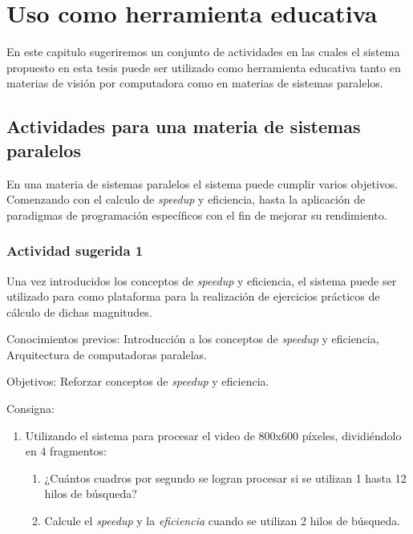 
\section{Uso como herramienta educativa}

\label{usoEducativo}

En este capitulo sugeriremos un conjunto de actividades en las cuales el sistema
propuesto en esta tesis puede ser utilizado como herramienta educativa tanto en
materias de visión por computadora como en materias de sistemas paralelos.

\subsection{Actividades para una materia de sistemas paralelos}

En una materia de sistemas paralelos el sistema puede cumplir varios objetivos.
Comenzando con el calculo de \emph{speedup} y eficiencia, hasta la aplicación de
paradigmas de programación específicos con el fin de mejorar su rendimiento.

\subsubsection{Actividad sugerida 1}

Una vez introducidos los conceptos de \emph{speedup} y eficiencia, el sistema
puede ser utilizado para como plataforma para la realización de ejercicios
prácticos de cálculo de dichas magnitudes.

\begin{description}

	\item{Conocimientos previos}: Introducción a los conceptos de
		\emph{speedup} y eficiencia, Arquitectura de computadoras
		paralelas.

	\item{Objetivos}: Reforzar conceptos de \emph{speedup} y eficiencia.

	\item{Consigna}: \begin{enumerate}

	\item{Utilizando el sistema para procesar el video de 800x600 píxeles,
		dividiéndolo en 4 fragmentos:

\begin{enumerate}

	\item{¿Cuántos cuadros por segundo se logran procesar si se utilizan 1
		hasta 12 hilos de búsqueda?}

	\item{Calcule el \emph{speedup} y la \emph{eficiencia} cuando se
		utilizan 2 hilos de búsqueda.}

\end{enumerate}}

\end{enumerate}

\end{description}

